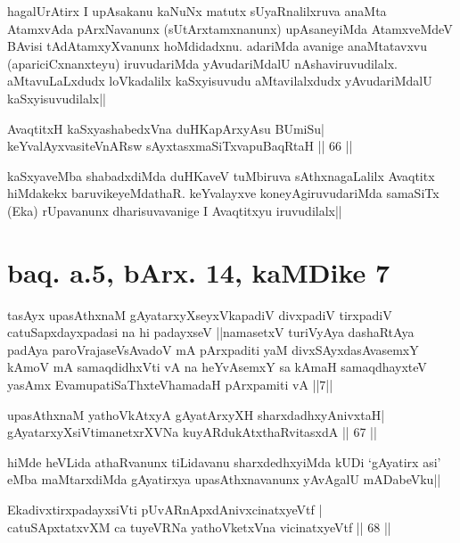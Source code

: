 \begin{artha} 
hagalUrAtirx I upAsakanu kaNuNx matutx sUyaRnalilxruva anaMta 
AtamxvAda pArxNavanunx (sUtArxtamxnanunx) upAsaneyiMda AtamxveMdeV 
BAvisi tAdAtamxyXvanunx hoMdidadxnu. adariMda avanige anaMtatavxvu 
(apariciCxnanxteyu) iruvudariMda yAvudariMdalU nAshaviruvudilalx. 
aMtavuLaLxdudx loVkadalilx kaSxyisuvudu aMtavilalxdudx yAvudariMdalU 
kaSxyisuvudilalx||
\end{artha}

\begin{shl}
AvaqtitxH kaSxyashabedxVna duHKapArxyAsu BUmiSu| \\
keYvalAyxvasiteVnARsw sAyxtasxmaSiTxvapuBaqRtaH \hfill||  66 || 
\end{shl}

\begin{artha} 
kaSxyaveMba shabadxdiMda duHKaveV tuMbiruva sAthxnagaLalilx Avaqtitx 
hiMdakekx baruvikeyeMdathaR. keYvalayxve koneyAgiruvudariMda samaSiTx 
(Eka) rUpavanunx dharisuvavanige I Avaqtitxyu iruvudilalx||
\end{artha}

\section*{baq. a.5, bArx. 14, kaMDike 7}

\begin{shl}
tasAyx upasAthxnaM gAyatarxyXseyxVkapadiV divxpadiV tirxpadiV catuSapxdayxpadasi na hi padayxseV ||namasetxV turiVyAya dashaRtAya padAya paroVrajaseV\s sAvadoV mA pArxpaditi yaM divxSAyxdasAvasemxY kAmoV mA samaqdidhxVti vA na heYvAsemxY sa kAmaH samaqdhayxteV yasAmx EvamupatiSaThxteV\s hamadaH pArxpamiti vA ||7||
\end{shl}

\begin{shl}
upasAthxnaM yathoVkAtxyA gAyatArxyXH sharxdadhxyA\s nivxtaH| \\
gAyatarxyXsiVtimanetxrXVNa kuyARdukAtxthaRvitasxdA \hfill||  67 || 
\end{shl}

\begin{artha} 
hiMde heVLida athaRvanunx tiLidavanu sharxdedhxyiMda kUDi `gAyatirx 
asi' eMba maMtarxdiMda gAyatirxya upasAthxnavanunx yAvAgalU mADabeVku||
\end{artha}

\begin{shl}
EkadivxtirxpadayxsiVti pUvARnApxdAnivxcinatxyeVtf | \\
catuSApxtatxvXM ca tuyeVRNa yathoVketxVna vicinatxyeVtf \hfill||  68 || 
\end{shl}

